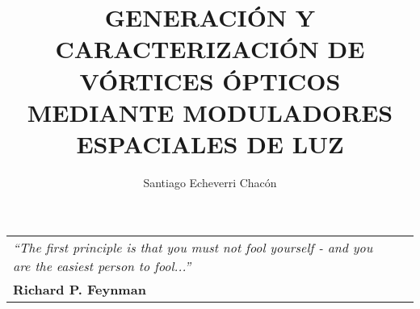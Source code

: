 \documentclass[11pt,spanish, twoside]{SETUP/ezthesis}
\author{Santiago Echeverri Chacón}
\title{GENERACIÓN Y CARACTERIZACIÓN DE VÓRTICES
                  ÓPTICOS MEDIANTE MODULADORES ESPACIALES DE LUZ}
\begin{document}


\frontmatter

\clearpage


\vspace*{5cm}
\begin{flushright}
\begin{tabular}{p{10cm}r}
\emph{``The first principle is that you must not fool yourself - and you are the easiest person to fool...''} \\
\textbf{Richard P. Feynman}
\end{tabular}
\end{flushright}
\thispagestyle{empty}






\setcounter{secnumdepth}{5} %
\setcounter{tocdepth}{5}    %
\tableofcontents
\listoffigures

% 
% 
% 

% 
% 
% 
% 
% 





\printnomenclature %


\label{sec:glossary} %


\mainmatter
\pagestyle{fancy}
\end{document}
